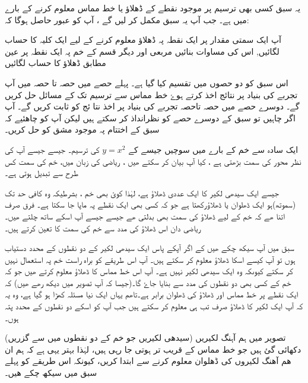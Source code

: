 
یہ سبق کسی بھی  ترسیم پر موجود نقطے کے ڈھلاؤ یا خط مماس معلوم کرنے کے بارے میں ہے۔  جب آپ یہ سبق مکمل کر لیں گے ، آپ کو عبور حاصل ہوگا کہ:
 
 
آپ ایک سمتی مقدار پر ایک نقطہ پہ  ڈھلاؤ معلوم کرنے کے لیے ایک کلیہ کا حساب لگائیں, اس کی مساوات بنائیں
 مربعی اور دیگر قسم کے خم پہ ایک نقطہ پر عین مطابق ڈھلاؤ کا حساب لگائیں 
 

اس سبق کو دو حصوں میں تقسیم کیا گیا ہے۔ پہلے حصے میں حصہ  تا حصہ   میں آپ تجربے کی بنیاد پر نتائج اخذ کرتے ہوۓ خط مماس سے ترسیم تک کے مسائل حل کریں گے۔ دوسرے حصے میں حصہ   تاحصہ   تجربے کی بنیاد پر اخذ   نتا ئج کو  ثابت کریں گے۔
آپ اگر چاہیں تو سبق کے دوسرے حصے کو نظرانداذ کر سکتے ہیں لیکن آپ کو چاھئیے کہ سبق کے اختتام پہ موجود مشق کو حل کریں۔

 
ایک سادہ سے خم کے بارے میں سوچیں جیسے کے  \( y=x^{2}\) کی ترسیم۔ جیسے جیسے  آپ کی نظر   محور کی سمت بڑھتی ہے ، کیا آپ بیان کر سکتے ھیں ، ریاضی کی زبان میں، خم کی سمت کس طرح سے تبدیل ہوتی ہے۔

جیسے ایک سیدھی لکیر کا ایک عددی ڈھلاؤ ہے، لہٰذا کوئ بھی خم ، بشرطیکہ وہ کافی حد تک (سموتھ)ہو ایک ڈھلوان یا ڈھلاؤرکھتا ہے جو کہ کسی بھی ایک نقطے پہ ماپا جا سکتا ہے۔ فرق صرف اتنا ھے کہ خم کے لیے ڈھلاؤ کی سمت بھی بدلتی ھے جیسے جیسے آپ اسکے ساتھ چلتے ھیں۔ ریاضی دان اس ڈھلاؤ کی مدد سے خم کی سمت کا تعین کرتے ہیں۔


سبق  میں آپ سیکھ چکے ھیں کے اگر آپکے پاس ایک سیدھی لکیر کے دو نقطوں کے محدد دستیاب ہوں تو آپ کیسے اسکا ڈھلاؤ معلوم کر سکتے ہیں۔ آپ اس طریقے کو براہ راست خم پہ استعمال نہیں کر سکتے کیوںکہ وہ ایک سیدھی لکیر نہیں ہے۔ آپ اس خط مماس کا ڈھلاؤ معلوم کرتے ھیں جو کہ خم کے  کسی بھی دو نقطوں کی مدد سے بنایا جاۓ گا۔(جیسا کہ آپ تصویر میں دیکھ رھے ھیں) کہ ایک نقطے پر خط مماس اور ڈھلاؤ کی ڈھلوان برابر ہے۔تاھم یہاں ایک نیا مسئلہ کھڑا ہو گیا ہے، وہ یہ کہ آپ ایک لکیر کا ڈھلاؤ صرف تب ہی معلوم کر سکتے ہیں جب آپ کو اسکے دو نقطوں کے محدد  پتہ ہوں۔

تصویر  میں ہم آہنگ لکیریں (سیدھی لکیریں جو خم کے دو نقطوں میں سے گزریں) دکھائی گئ ہیں جو خط مماس کے قریب تر ہوتی جا رہی ہیں، لہٰذا بہتر یہی ہے کہ ہم ان ھم آھنگ لکیروں کی ڈھلوان معلوم کرنے سے ابتدا کریں، کیونکہ اس طریقے کو پہلے سبق میں سیکھ چکے ھیں۔




